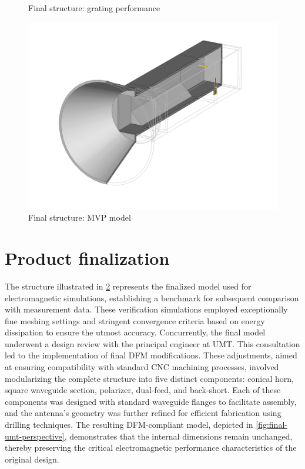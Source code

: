\documentclass[11pt,a4paper,twoside,openany]{report}
\begin{document}
\begin{figure}[!ht]
    \centering
    
    \caption{\label{fig:grating-vs-mvp-sparameters}Final structure: grating performance}
\end{figure}

\begin{figure}[!ht]
    \centering
    \includegraphics[width=.9\textwidth]{src/final_perspective.png}
    \caption{\label{fig:final-perspective}Final structure: MVP model}
\end{figure}

\section{Product finalization}
The structure illustrated in \cref{fig:final-perspective} represents the finalized model used for electromagnetic simulations, establishing a benchmark for subsequent comparison with measurement data. These verification simulations employed exceptionally fine meshing settings and stringent convergence criteria based on energy dissipation to ensure the utmost accuracy. Concurrently, the final model underwent a design review with the principal engineer at UMT. This consultation led to the implementation of final DFM modifications. These adjustments, aimed at ensuring compatibility with standard CNC machining processes, involved modularizing the complete structure into five distinct components: conical horn, square waveguide section, polarizer, dual-feed, and back-short. Each of these components was designed with standard waveguide flanges to facilitate assembly, and the antenna's geometry was further refined for efficient fabrication using drilling techniques. The resulting DFM-compliant model, depicted in \cref{fig:final-umt-perspective}, demonstrates that the internal dimensions remain unchanged, thereby preserving the critical electromagnetic performance characteristics of the original design.
\end{document}
